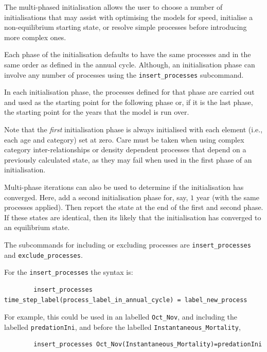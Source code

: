 The multi-phased initialisation allows the user to choose a number of initialisations that may assist with optimising the models for speed, initialise a non-equilibrium starting state, or resolve simple processes before introducing more complex ones.

Each phase of the initialisation defaults to have the same processes and in the same order as defined in the annual cycle. Although, an initialisation phase can involve any number of processes using the \texttt{insert\_processes} subcommand.

In each initialisation phase, the processes defined for that phase are carried out and used as the starting point for the following phase or, if it is the last phase, the starting point for the years that the model is run over. 

Note that the \emph{first} initialisation phase is always initialised with each element (i.e., each age and category) set at zero. Care must be taken when using complex category inter-relationships or density dependent processes that depend on a previously calculated state, as they may fail when used in the first phase of an initialisation. 

Multi-phase iterations can also be used to determine if the initialisation has converged. Here, add a second initialisation phase for, say, $1$ year (with the same processes applied). Then report the state at the end of the first and second phase. If these states are identical, then its likely that the initialisation has converged to an equilibrium state.

The subcommands for including or excluding processes are \texttt{insert\_processes} and \texttt{exclude\_processes}. 

For the \texttt{insert\_processes} the syntax is:
{\small{\begin{verbatim}
		insert_processes time_step_label(process_label_in_annual_cycle) = label_new_process
\end{verbatim}}}
		
For example, this could be used in an  labelled \texttt{Oct\_Nov}, and including the  labelled \texttt{predationIni}, and before the  labelled \texttt{Instantaneous\_Mortality}, 

{\small{\begin{verbatim}
		insert_processes Oct_Nov(Instantaneous_Mortality)=predationIni
\end{verbatim}}}

